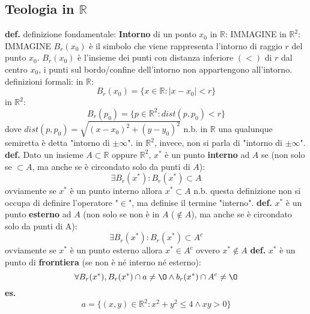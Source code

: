 \subsection*{Teologia in $\mathbb{R}$}
\textbf{def.} definizione fondamentale: \textbf{Intorno} di un ponto $x_0$
\newline
in $\mathbb{R}$: IMMAGINE
\newline
in $\mathbb{R}^2$: IMMAGINE
\newline
$B_r(x_0)$ è il simbolo che viene rappresenta l'intorno di raggio $r$ del punto $x_0$.
$B_r(x_0)$ è l'insieme dei punti con distanza inferiore $(<)$ di $r$ dal centro $x_0$, i punti sul bordo/confine dell'intorno non appartengono all'intorno.
\newline
definizioni formali:
\newline
in $\mathbb{R}$:
\[
    B_r(x_0) = \{x\in\mathbb{R}:|x-x_0|<r\}
\] 
\newline
in $\mathbb{R}^2$: 
\[
    B_r(p_0) = \{p\in\mathbb{R}^2:dist(p,p_0)<r\}
\]
dove $dist(p,p_0) = \sqrt{(x-x_0)^2+(y-y_0)^2}$
\newline
n.b. in $\mathbb{R}$ una qualunque semiretta è detta "intorno di $\pm\infty$". in $\mathbb{R}^2$, invece, non si parla di "intorno di $\pm\infty$".
\newline
\newline
\textbf{def.} Dato un insieme $A\subset \mathbb{R}$ oppure $\mathbb{R}^2$, $x^*$ è un punto \textbf{interno} ad $A$ se (non solo se $\subset A$, ma anche se è circondato solo da punti di $A$):
\[
    \exists B_r(x^*):B_r(x^*)\subset A
\] 
ovviamente se $x^*$ è un punto interno allora $x^*\subset A$
\newline
n.b. questa definizione non si occupa di definire l'operatore "$\in$", ma definise il termine "interno".
\newline
\newline
\textbf{def.} $x^*$ è un punto \textbf{esterno} ad $A$ (non solo se non è in $A$ ($\notin A$), ma anche se è circondato solo da punti di A):
\[
    \exists B_r(x^*):B_r(x^*)\subset A^c
\] 
ovviamente se $x^*$ è un punto esterno allora $x^*\in A^c$ ovvero $x^*\notin A$
\newline
\textbf{def.} $x^*$ è un punto di \textbf{frorntiera} (se non è né interno né esterno):
\[
    \forall B_r(x^*), B_r(x^*) \cap a\neq\O \land b_r(x^*) \cap A^c \neq \O
\] 
\textbf{es.}
\[
    a = \{(x,y)\in \mathbb{R}^2 : x^2+y^2 \leq 4 \land xy >0\}
\] 
\begin{figure}[ht]
    \centering
\end{figure}

